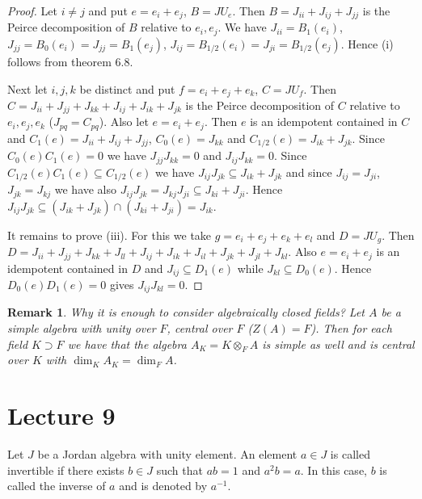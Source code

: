 \documentclass{article}
\newtheorem{remark}[theorem]{Remark}
\begin{document}
\begin{proof} 
Let $i \ne j$ and put $e = e_i + e_j$, $B = JU_e$. Then $B = J_{ii} + J_{ij} + J_{jj}$ is the Peirce decomposition of $B$ relative to $e_i, e_j$. We have $J_{ii} = B_1(e_i)$, $J_{jj} = B_0(e_i) = J_{jj} = B_1(e_j)$, $J_{ij} = B_{1/2}(e_i) = J_{ji} = B_{1/2}(e_j)$. Hence (i) follows from theorem 6.8. 

Next let $i,j,k$ be distinct and put $f = e_i + e_j + e_k$, $C = JU_f$. Then $C = J_{ii} + J_{jj} + J_{kk} + J_{ij} + J_{ik} + J_{jk}$ is the Peirce decomposition of $C$ relative to $e_i, e_j, e_k$ ($J_{pq} = C_{pq}$). Also let $e = e_i + e_j$. Then $e$ is an idempotent contained in $C$ and $C_1(e) = J_{ii} + J_{ij} + J_{jj}$, $C_0(e) = J_{kk}$ and $C_{1/2}(e) = J_{ik} + J_{jk}$. Since $C_0(e)C_1(e) = 0$ we have $J_{jj}J_{kk} = 0$ and $ J_{ij}J_{kk}=0 $. Since $C_{1/2}(e)C_1(e) \subseteq C_{1/2}(e)$ we have $J_{ij}J_{jk} \subseteq J_{ik} + J_{jk}$ and since $J_{ij}=J_{ji}$, $J_{jk}=J_{kj}$ we have also $J_{ij}J_{jk} = J_{kj}J_{ji} \subseteq J_{ki} + J_{ji}$. Hence $J_{ij}J_{jk} \subseteq (J_{ik} + J_{jk}) \cap (J_{ki} + J_{ji}) = J_{ik}$. 

It remains to prove (iii). For this we take $g = e_i + e_j + e_k + e_l$ and $D = JU_g$. Then $D = J_{ii} + J_{jj} + J_{kk} + J_{ll} + J_{ij} + J_{ik} + J_{il} + J_{jk} + J_{jl} + J_{kl}$. Also $e = e_i+e_j$ is an idempotent contained in $D$ and $J_{ij} \subseteq D_1(e)$ while $J_{kl} \subseteq D_0(e)$. Hence $D_0(e)D_1(e)=0$ gives $J_{ij}J_{kl}=0$.  
\end{proof}

\begin{remark}
Why it is enough to consider algebraically closed fields? Let $A$ be a simple algebra with unity over $F$, central over $F$ ($Z(A)=F$). Then for each field $K \supset F$ we have that the algebra $A_K = K \otimes_F A$ is simple as well and is central over $K$ with $\dim_K A_K = \dim_F A$.  
\end{remark}

\section{Lecture 9}

\begin{definition}  
Let $J$ be a Jordan algebra with unity element. An element $a \in J$ is called invertible if there exists $b \in J$ such that $ab=1$ and $a^2b=a$. In this case, $b$ is called the inverse of $a$ and is denoted by $a^{-1}$.  
\end{definition} 
\end{document}
